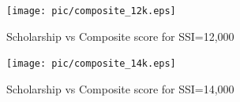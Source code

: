\documentclass[12pt,english]{report}
\begin{document}
\begin{figure} [!htbp]
\texttt{[image: pic/composite\_12k.eps]}
\caption{Scholarship vs Composite score for SSI=12,000} \label{allocation_results_h}
\end{figure}


\begin{figure} [!htbp]
\texttt{[image: pic/composite\_14k.eps]}
\caption{Scholarship vs Composite score for SSI=14,000} \label{allocation_results_i}
\end{figure}

\end{document}
